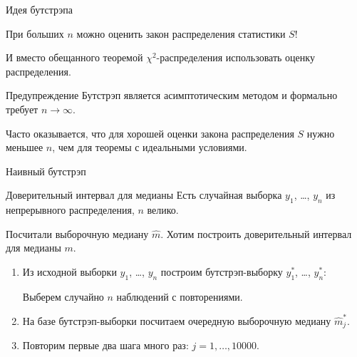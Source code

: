 \begin{frame}{Идея бутстрэпа}

  При больших $n$ можно \alert{оценить закон распределения} статистики $S$!

  \pause

  И вместо обещанного теоремой $\chi^2$-распределения \alert{использовать оценку распределения}.

  \pause

  \begin{block}{Предупреждение}
  Бутстрэп является асимптотическим методом и формально требует $n \to \infty$. 
  \end{block}

  \pause 

  Часто оказывается, что для хорошей оценки закона распределения $S$ нужно меньшее $n$, чем для теоремы с идеальными условиями.
\end{frame}





\begin{frame}{Наивный бутстрэп}

\begin{block}{Доверительный интервал для медианы}
Есть случайная выборка $y_1$, \ldots, $y_n$ из непрерывного распределения, $n$ велико. 

Посчитали выборочную медиану $\hat m$. Хотим построить доверительный интервал для медианы $m$. 
\end{block}

\pause
\begin{enumerate}[<+->]
  \item Из исходной выборки $y_1$, \ldots, $y_n$ построим бутстрэп-выборку $y^*_1$, \ldots, $y^*_n$:
  
  Выберем случайно $n$ наблюдений с повторениями. 
  \item На базе бутстрэп-выборки посчитаем очередную выборочную медиану $\hat m_j^*$.
  \item Повторим первые два шага много раз: $j = 1, \ldots, 10000$.
\end{enumerate}


\end{frame}



